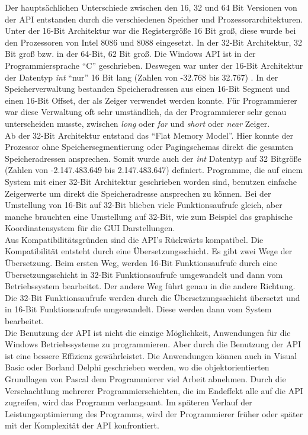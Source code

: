Der hauptsächlichen Unterschiede zwischen den 16, 32 und 64 Bit Versionen von der API entstanden durch die verschiedenen Speicher und Prozessorarchitekturen. Unter der 16-Bit Architektur war die Registergröße 16 Bit groß, diese wurde bei den Prozessoren von Intel 8086 und 8088 eingesetzt. In der 32-Bit Architektur, 32 Bit groß bzw. in der 64-Bit, 62 Bit groß. Die Windows API ist in der Programmiersprache "`C"' geschrieben. Deswegen war unter der 16-Bit Architektur der Datentyp \textit{int} "`nur"' 16 Bit lang (Zahlen von -32.768 bis 32.767) . In der Speicherverwaltung bestanden Speicheradressen aus einen 16-Bit Segment und einen 16-Bit Offset, der als Zeiger verwendet werden konnte. Für Programmierer war diese Verwaltung oft sehr umständlich, da der Programmierer sehr genau unterscheiden musste, zwischen \textit{long} oder \textit{far} und \textit{short} oder \textit{near} Zeiger. 
\\

Ab der 32-Bit Architektur entstand das "`Flat Memory Model"'. Hier konnte der Prozessor ohne Speichersegmentierung oder Pagingschemas direkt die gesamten Speicheradressen ansprechen. Somit wurde auch der \textit{int} Datentyp auf 32 Bitgröße (Zahlen von -2.147.483.649 bis 2.147.483.647) definiert. Programme, die auf einem System mit einer 32-Bit Architektur geschrieben worden sind, benutzen einfache Zeigerwerte um direkt die Speicheradresse ansprechen zu können. Bei der Umstellung von 16-Bit auf 32-Bit blieben viele Funktionsaufrufe gleich, aber manche brauchten eine Umstellung auf 32-Bit, wie zum Beispiel das graphische Koordinatensystem für die GUI Darstellungen.
\\

Aus Kompatibilitätsgründen sind die API's Rückwärts kompatibel. Die Kompatibilität entsteht durch eine Übersetzungsschicht. Es gibt zwei Wege der Übersetzung. Beim ersten Weg, werden 16-Bit Funktionsaufrufe durch eine Übersetzungsschicht in 32-Bit Funktionsaufrufe umgewandelt und dann vom Betriebssystem bearbeitet. Der andere Weg führt genau in die andere Richtung. Die 32-Bit Funktionsaufrufe werden durch die Übersetzungsschicht übersetzt und in 16-Bit Funktionsaufrufe umgewandelt. Diese werden dann vom System bearbeitet.\\


Die Benutzung der API ist nicht die einzige Möglichkeit, Anwendungen für die Windows Betriebssysteme zu programmieren. Aber durch die Benutzung der API ist eine bessere Effizienz gewährleistet. Die Anwendungen können auch in Visual Basic oder Borland Delphi geschrieben werden, wo die objektorientierten Grundlagen von Pascal dem Programmierer viel Arbeit abnehmen. Durch die Verschachtlung mehrerer Programmierschichten, die im Endeffekt alle auf die API zugreifen, wird das Programm verlangsamt. Im späteren Verlauf der Leistungsoptimierung des Programms, wird der Programmierer früher oder später mit der Komplexität der API konfrontiert.




